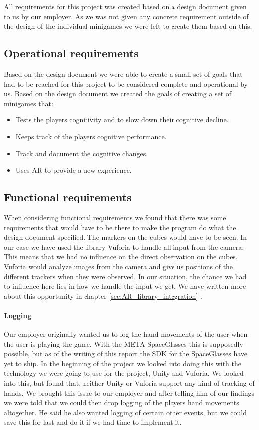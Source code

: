 All requirements for this project was created based on a design document given to us by our employer.
As we was not given any concrete requirement outside of the design of the individual minigames we
were left to create them based on this.


\subsection{Operational requirements}
Based on the design document we were able to create a small set of goals that had to be reached for this project
to be considered complete and operational by us.
Based on the design document we created the goals of creating a set of minigames that:
\begin{itemize}
	\item Tests the players cognitivity and to slow down their cognitive decline.
	\item Keeps track of the players cognitive performance.
	\item Track and document the cognitive changes.
	\item Uses AR to provide a new experience.
\end{itemize}

\subsection{Functional requirements}
When considering functional requirements we found that there was some requirements that would have to be there to make the program do what the design document specified. 
The markers on the cubes would have to be seen. 
In our case we have used the library \gls{Vuforia} to handle all input from the camera.
This means that we had no influence on the direct observation on the cubes. 
Vuforia would analyze images from the camera and give us positions of the different trackers when they were observed. 
In our situation, the chance we had to influence here lies in how we handle the input we get. 
We have written more about this opportunity in chapter \ref{sec:AR_library_integration} .

\paragraph{Logging}
Our employer originally wanted us to log the hand movements of the user when the user is playing the game. 
With the META SpaceGlasses this is supposedly possible, but as of the writing of this report the SDK for the SpaceGlasses have yet to ship. 
In the beginning of the project we looked into doing this with the technology we were going to use for the project, Unity and Vuforia. 
We looked into this, but found that, neither Unity or Vuforia support any kind of tracking of hands. 
We brought this issue to our employer and after telling him of our findings we were told that we could then drop logging of the players hand movements altogether. 
He said he also wanted logging of certain other events, but we could save this for last and do it if we had time to implement it.


